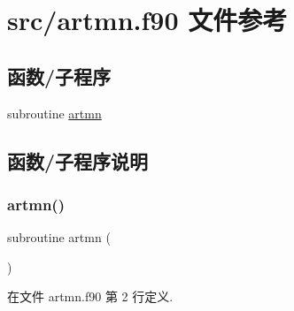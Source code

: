 \hypertarget{artmn_8f90}{}\section{src/artmn.f90 文件参考}
\label{artmn_8f90}
\subsection*{函数/子程序}
\begin{DoxyCompactItemize}
\item 
subroutine \mbox{\hyperlink{artmn_8f90_ae64c0027dfd39be35dbd3eaeba1b5470}{artmn}}
\end{DoxyCompactItemize}


\subsection{函数/子程序说明}
\mbox{\label{artmn_8f90_ae64c0027dfd39be35dbd3eaeba1b5470}} 
\subsubsection{\texorpdfstring{artmn()}{artmn()}}
{\footnotesize\ttfamily subroutine artmn (\begin{DoxyParamCaption}{ }\end{DoxyParamCaption})}



在文件 artmn.\+f90 第 2 行定义.

